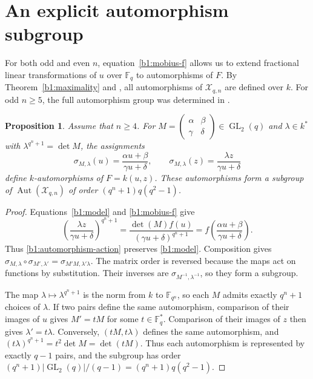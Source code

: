 \documentclass[12pt,reqno]{amsart}
\numberwithin{equation}{section}
\newcommand{\F}{\mathbb F}
\DeclareMathOperator{\Aut}{Aut}
\DeclareMathOperator{\GL}{GL}
\theoremstyle{plain}
\newtheorem{proposition}[theorem]{Proposition}
\theoremstyle{definition}
\theoremstyle{remark}
\begin{document}
\section{An explicit automorphism subgroup}
\label{b1:automorphisms-section}

For both odd and even \(n\), equation~\eqref{b1:mobius-f} allows us
to extend fractional linear transformations of \(u\) over \(\F_q\)
to automorphisms of \(F\).
By Theorem~\ref{b1:maximality} and \cite[Theorem~3.10]{GSY2015},
all automorphisms of \(\mathcal X_{q,n}\) are defined over \(k\).
For odd \(n\ge5\), the full automorphism group was determined in
\cite[Theorem~4.3]{BM2018}.

\begin{proposition}
\label{b1:automorphism-subgroup}
Assume that \(n\ge4\). For
\(M=\left(\begin{smallmatrix}\alpha&\beta\\\gamma&\delta\end{smallmatrix}\right)
\in\GL_2(q)\) and \(\lambda\in k^*\) with \(\lambda^{q^n+1}=\det M\),
the assignments
\begin{equation}
\label{b1:automorphism-action}
 \sigma_{M,\lambda}(u)=\frac{\alpha u+\beta}{\gamma u+\delta},\qquad
 \sigma_{M,\lambda}(z)=\frac{\lambda z}{\gamma u+\delta}
\end{equation}
define \(k\)-automorphisms of \(F=k(u,z)\). These automorphisms
form a subgroup of \(\Aut(\mathcal X_{q,n})\) of order
\((q^n+1)q(q^2-1)\).
\end{proposition}

\begin{proof}
Equations~\eqref{b1:model} and \eqref{b1:mobius-f} give
\[
 \left(\frac{\lambda z}{\gamma u+\delta}\right)^{q^n+1}
 =\frac{\det(M)f(u)}{(\gamma u+\delta)^{q^n+1}}
 =f\!\left(\frac{\alpha u+\beta}{\gamma u+\delta}\right).
\]
Thus \eqref{b1:automorphism-action} preserves \eqref{b1:model}.
Composition gives
\(\sigma_{M,\lambda}\circ\sigma_{M',\lambda'}
=\sigma_{M'M,\lambda'\lambda}\).
The matrix order is reversed because the maps act on functions
by substitution. Their inverses are
\(\sigma_{M^{-1},\lambda^{-1}}\), so they form a subgroup.

The map \(\lambda\mapsto\lambda^{q^n+1}\) is the norm from \(k\) to
\(\F_{q^n}\), so each \(M\) admits exactly \(q^n+1\) choices of
\(\lambda\). If two pairs define the same automorphism, comparison
of their images of \(u\) gives \(M'=tM\) for some \(t\in\F_q^*\).
Comparison of their images of \(z\) then gives
\(\lambda'=t\lambda\). Conversely, \((tM,t\lambda)\) defines the
same automorphism, and
\((t\lambda)^{q^n+1}=t^2\det M=\det(tM)\).
Thus each automorphism is represented by exactly \(q-1\) pairs,
and the subgroup has order
\((q^n+1)|\GL_2(q)|/(q-1)=(q^n+1)q(q^2-1)\).
\end{proof}
\end{document}
